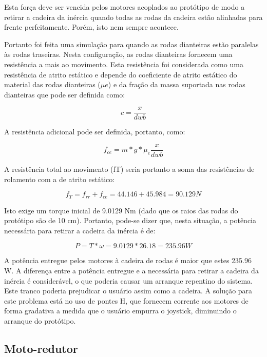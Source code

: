 Esta força deve ser vencida pelos motores acoplados ao protótipo de modo a retirar a cadeira da inércia quando todas as rodas da cadeira estão alinhadas para frente perfeitamente. Porém, isto nem sempre acontece.

Portanto foi feita uma simulação para quando as rodas dianteiras estão paralelas às rodas traseiras. Nesta configuração, as rodas dianteiras fornecem uma resistência a mais ao movimento. Esta resistência foi considerada como uma resistência de atrito estático e depende do coeficiente de atrito estático do material das rodas dianteiras ($\mu e$) e da fração da massa suportada nas rodas dianteiras que pode ser definida como:

\begin{equation}
c = \frac{x}{dwb}
\end{equation}

A resistência adicional pode ser definida, portanto, como:

\begin{equation}
f_{ce}= m*g* \mu_e \frac{x}{dwb}
\end{equation}

A resistência total ao movimento (fT) seria portanto a soma das resistências de rolamento com a de atrito estático:

\begin{equation}
f_T = f_{rr} + f_{ce} = 44.146+45.984 = 90.129 N
\end{equation}

Isto exige um torque inicial de 9.0129 Nm (dado que os raios das rodas do protótipo são de 10 cm). Portanto, pode-se dizer que, nesta situação, a potência necessária para retirar a cadeira da inércia é de:

\begin{equation}
P = T*\omega = 9.0129*26.18 = 235.96 W
\end{equation}

	A potência entregue pelos motores à cadeira de rodas é maior que estes 235.96 W. A diferença entre a potência entregue e a necessária para retirar a cadeira da inércia é considerável, o que poderia causar um arranque repentino do sistema. Este tranco poderia prejudicar o usuário assim como a cadeira. A solução para este problema está no uso de pontes H, que fornecem corrente aos motores de forma gradativa a medida que o usuário empurra o joystick, diminuindo o arranque do protótipo.

	\subsection{Moto-redutor}

